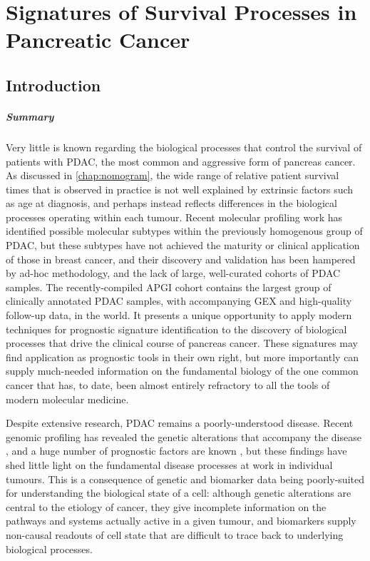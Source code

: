 \documentclass[dissertation.tex]{subfiles}
\begin{document}
\chapter{Signatures of Survival Processes in Pancreatic Cancer}
\label{chap:signatures}


\section{Introduction}

\paragraph{Summary}Very little is known regarding the biological processes that control the survival of patients with \gls{PDAC}, the most common and aggressive form of pancreas cancer.  As discussed in \cref{chap:nomogram}, the wide range of relative patient survival times that is observed in practice is not well explained by extrinsic factors such as age at diagnosis, and perhaps instead reflects differences in the biological processes operating within each tumour.  Recent molecular profiling work has identified possible molecular subtypes within the previously homogenous group of \gls{PDAC}, but these subtypes have not achieved the maturity or clinical application of those in breast cancer, and their discovery and validation has been hampered by ad-hoc methodology, and the lack of large, well-curated cohorts of \gls{PDAC} samples.  The recently-compiled \gls{APGI} cohort contains the largest group of clinically annotated \gls{PDAC} samples, with accompanying \gls{GEX} and high-quality follow-up data, in the world.  It presents a unique opportunity to apply modern techniques for prognostic signature identification to the discovery of biological processes that drive the clinical course of pancreas cancer.  These signatures may find application as prognostic tools in their own right, but more importantly can supply much-needed information on the fundamental biology of the one common cancer that has, to date, been almost entirely refractory to all the tools of modern molecular medicine.

\vspace{1cm}

Despite extensive research, \gls{PDAC} remains a poorly-understood disease.  Recent genomic profiling has revealed the genetic alterations that accompany the disease \cite{Biankin2012}, and a huge number of prognostic factors are known \cite{Harsha2009}, but these findings have shed little light on the fundamental disease processes at work in individual tumours.  This is a consequence of genetic and biomarker data being poorly-suited for understanding the biological state of a cell: although genetic alterations are central to the etiology of cancer, they give incomplete information on the pathways and systems actually active in a given tumour, and biomarkers supply non-causal readouts of cell state that are difficult to trace back to underlying biological processes.
\end{document}
